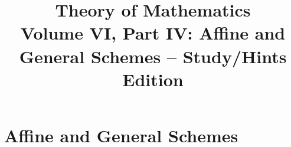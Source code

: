 \documentclass[11pt,a4paper,oneside,openany]{book}
\title{Theory of Mathematics\\[0.5em]\Large Volume VI, Part IV: Affine and General Schemes -- Study/Hints Edition}
\author{}\date{}
\begin{document}
\maketitle\clearpage
\frontmatter\tableofcontents\mainmatter
\part{Affine and General Schemes}
\setcounter{chapter}{17}



\end{document}
